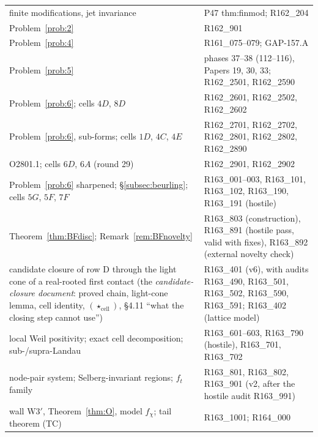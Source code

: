 \documentclass[11pt]{amsart}
\theoremstyle{definition}
\theoremstyle{remark}
\begin{document}
\begin{center}
\begin{tabularx}{\textwidth}{@{}p{5.2cm}Y@{}}
finite modifications, jet invariance & P47 thm:finmod; R162\_204 \\
Problem~\ref{prob:2} & R162\_901 \\
Problem~\ref{prob:4} & R161\_075--079; GAP-157.A \\
Problem~\ref{prob:5} & phases 37--38 (112--116), Papers 19, 30, 33; R162\_2501, R162\_2590 \\
Problem~\ref{prob:6}; cells $4D$, $8D$ & R162\_2601, R162\_2502, R162\_2602 \\
Problem~\ref{prob:6}, sub-forms; cells $1D$, $4C$, $4E$ & R162\_2701, R162\_2702, R162\_2801, R162\_2802, R162\_2890 \\
O2801.1; cells $6D$, $6A$ (round 29) & R162\_2901, R162\_2902 \\
Problem~\ref{prob:6} sharpened; \S\ref{subsec:beurling}; cells $5G$, $5F$, $7F$ & R163\_001--003, R163\_101, R163\_102, R163\_190, R163\_191 (hostile) \\
Theorem~\ref{thm:BFdisc}; Remark~\ref{rem:BFnovelty} & R163\_803 (construction), R163\_891 (hostile pass, valid with fixes), R163\_892 (external novelty check) \\
candidate closure of row D through the light cone of a real-rooted first contact (the \emph{candidate-closure document}: proved chain, light-cone lemma, cell identity, $(\star_{\mathrm{cell}})$, \S4.11 ``what the closing step cannot use'') & R163\_401 (v6), with audits R163\_490, R163\_501, R163\_502, R163\_590, R163\_591; R163\_402 (lattice model) \\
local Weil positivity; exact cell decomposition; sub-/supra-Landau & R163\_601--603, R163\_790 (hostile), R163\_701, R163\_702 \\
node-pair system; Selberg-invariant regions; $f_t$ family & R163\_801, R163\_802, R163\_901 (v2, after the hostile audit R163\_991) \\
wall W3$'$, Theorem~\ref{thm:O}, model $f_\chi$; tail theorem (TC) & R163\_1001; R164\_000 \\
\bottomrule
\end{tabularx}
\end{center}
\end{document}
